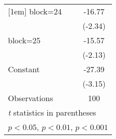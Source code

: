 {\begin{longtable}{l*{1}{c}}
[1em]
block=24            &      -16.77\sym{*}  \\
                    &     (-2.34)         \\
[1em]
block=25            &      -15.57\sym{*}  \\
                    &     (-2.13)         \\
[1em]
Constant            &      -27.39\sym{**} \\
                    &     (-3.15)         \\
\hline
Observations        &         100         \\
\hline\hline
\multicolumn{2}{l}{\footnotesize \textit{t} statistics in parentheses}\\
\multicolumn{2}{l}{\footnotesize \sym{*} \(p<0.05\), \sym{**} \(p<0.01\), \sym{***} \(p<0.001\)}\\
\end{longtable}
}
